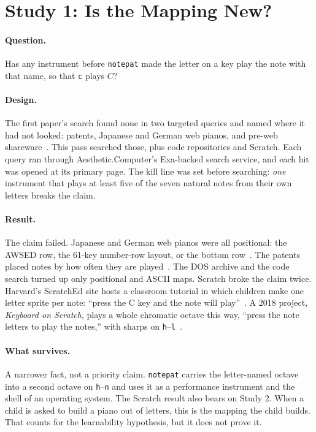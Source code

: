 \documentclass[10pt,letterpaper,twocolumn]{article}
\newcommand{\acdot}{{\color{acpink}.}}
\newcommand{\ac}{Aesthetic{\acdot}Computer}
\newcommand{\np}{\texttt{notepat}}
\newcommand{\key}[1]{\texttt{#1}}
\begin{document}
\section{Study 1: Is the Mapping New?}
\label{sec:s1}

\paragraph{Question.} Has any instrument before \np{} made the letter on a key play the note with that name, so that \key{c} plays $C$?

\paragraph{Design.} The first paper's search found none in two targeted queries and named where it had not looked: patents, Japanese and German web pianos, and pre-web shareware~\citep{scudder2026laptop}. This pass searched those, plus code repositories and Scratch. Each query ran through \ac{}'s Exa-backed search service, and each hit was opened at its primary page. The kill line was set before searching: \emph{one} instrument that plays at least five of the seven natural notes from their own letters breaks the claim.

\paragraph{Result.} The claim failed. Japanese and German web pianos were all positional: the AWSED row, the 61-key number-row layout, or the bottom row~\citep{webmusic_ja,toolsforanyone_de}. The patents placed notes by how often they are played~\citep{patent6444888}. The DOS archive and the code search turned up only positional and ASCII maps. Scratch broke the claim twice. Harvard's ScratchEd site hosts a classroom tutorial in which children make one letter sprite per note: ``press the C key and the note will play''~\citep{sienna_scratchpiano}. A 2018 project, \emph{Keyboard on Scratch}, plays a whole chromatic octave this way, ``press the note letters to play the notes,'' with sharps on \key{h}--\key{l}~\citep{persam2018scratch}.

\paragraph{What survives.} A narrower fact, not a priority claim. \np{} carries the letter-named octave into a second octave on \key{h}--\key{n} and uses it as a performance instrument and the shell of an operating system. The Scratch result also bears on Study 2. When a child is asked to build a piano out of letters, this is the mapping the child builds. That counts for the learnability hypothesis, but it does not prove it.
\end{document}
